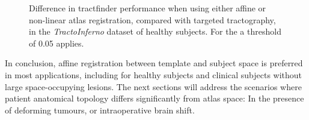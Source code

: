 \begin{figure}[hbt!]
  \caption[Comparing linear and non-linear atlas registration]{Difference in tractfinder performance when using either affine or non-linear atlas registration, compared with targeted  tractography, in the \textit{TractoInferno} dataset of healthy subjects. For the  a threshold of 0.05 applies.}\label{fig:nrr}
\end{figure}

In conclusion, affine registration between template and subject space is preferred in most applications, including for healthy subjects and clinical subjects without large space-occupying lesions.
The next sections will address the scenarios where patient anatomical topology differs significantly from atlas space:
In the presence of deforming tumours, or intraoperative brain shift.

